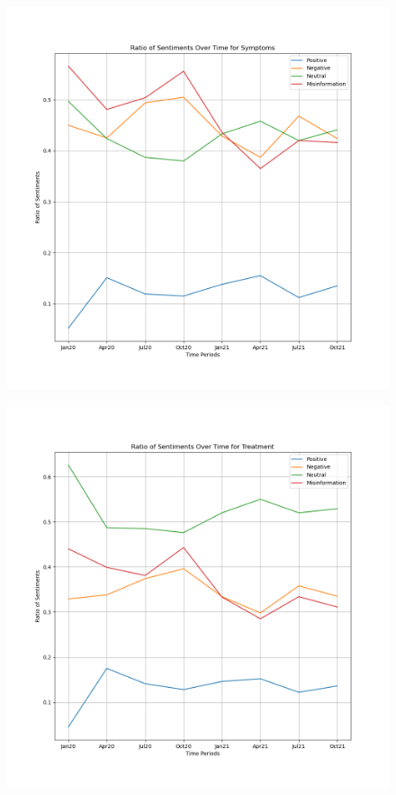 \documentclass{l4proj}
\begin{document}
\begin{appendices}
\begin{figure}[H]
\begin{minipage}[c]{0.49\linewidth}
\label{fig:healthsen}
\end{minipage}
\end{figure}

\begin{figure}[H]
\begin{minipage}[c]{0.49\linewidth}
\centering
\includegraphics[width=\textwidth]{images/SymptomsSentiment.png}
\label{fig:sympsen}
\end{minipage}\hfill
\begin{minipage}[c]{0.49\linewidth}
\centering
\includegraphics[width=\textwidth]{images/TreatmentSentiment.png}

\end{minipage}
\end{figure}
\end{appendices}
\end{document}
